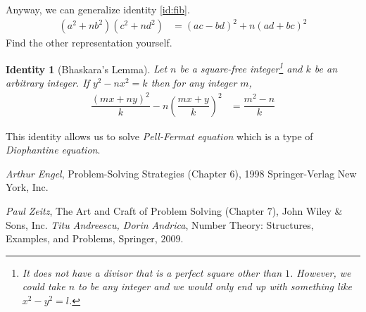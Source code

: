\documentclass[a4paper, leqno]{article}
\newtheorem{identity}{Identity}
\theoremstyle{definition}
\theoremstyle{remark}
\begin{document}
		Anyway, we can generalize identity \eqref{id:fib}.
			\begin{align*}
				(a^2+nb^2)(c^2+nd^2) & = (ac-bd)^2+n(ad+bc)^2
			\end{align*}
		Find the other representation yourself.
			\begin{identity}[Bhaskara's Lemma]
				Let $n$ be a square-free integer\footnote{It does not have a divisor that is a perfect square other than $1$. However, we could take $n$ to be any integer and we would only end up with something like $x^2-y^2=l$.} and $k$ be an arbitrary integer. If $y^2-nx^2 = k$ then for any integer $m$,
					\begin{align*}
						\dfrac{(mx+ny)^2}{k}-n\left(\dfrac{mx+y}{k}\right)^2 & = \dfrac{m^2-n}{k}
					\end{align*}
			\end{identity}
		This identity allows us to solve \textit{Pell-Fermat equation} which is a type of \textit{Diophantine equation}.
		
	\begin{thebibliography}{99}
		 \textit{Arthur Engel}, Problem-Solving Strategies (Chapter $6$), 1998 Springer-Verlag New York, Inc.
		
		 \textit{Paul Zeitz}, The Art and Craft of Problem Solving (Chapter $7$), John Wiley \& Sons, Inc.
		 \textit{Titu Andreescu, Dorin Andrica}, Number Theory: Structures, Examples, and Problems, Springer, $2009$.
		
	\end{thebibliography}
\end{document}
